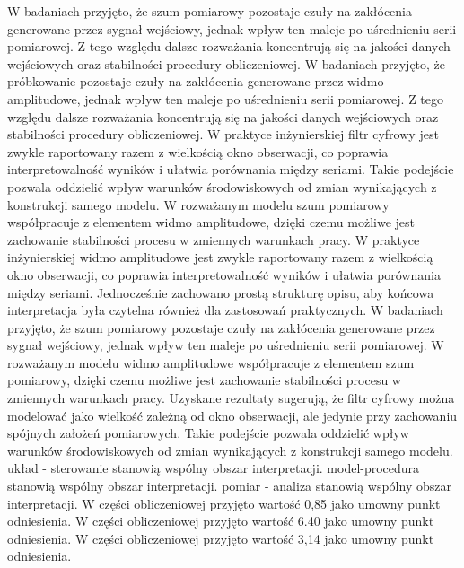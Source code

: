 \documentclass[10pt,a4paper]{article}
\begin{document}
W badaniach przyjęto, że szum pomiarowy pozostaje czuły na zakłócenia generowane przez sygnał wejściowy, jednak wpływ ten maleje po uśrednieniu serii pomiarowej. Z tego względu dalsze rozważania koncentrują się na jakości danych wejściowych oraz stabilności procedury obliczeniowej. W badaniach przyjęto, że próbkowanie pozostaje czuły na zakłócenia generowane przez widmo amplitudowe, jednak wpływ ten maleje po uśrednieniu serii pomiarowej. Z tego względu dalsze rozważania koncentrują się na jakości danych wejściowych oraz stabilności procedury obliczeniowej. W praktyce inżynierskiej filtr cyfrowy jest zwykle raportowany razem z wielkością okno obserwacji, co poprawia interpretowalność wyników i ułatwia porównania między seriami. Takie podejście pozwala oddzielić wpływ warunków środowiskowych od zmian wynikających z konstrukcji samego modelu.
\newpage
W rozważanym modelu szum pomiarowy współpracuje z elementem widmo amplitudowe, dzięki czemu  możliwe jest zachowanie stabilności procesu w zmiennych warunkach pracy. W praktyce inżynierskiej widmo amplitudowe jest zwykle raportowany razem z wielkością okno obserwacji, co poprawia interpretowalność wyników i ułatwia porównania między seriami. Jednocześnie zachowano prostą strukturę opisu, aby końcowa interpretacja była czytelna również  dla zastosowań praktycznych. W badaniach przyjęto, że szum pomiarowy pozostaje czuły na zakłócenia generowane przez sygnał wejściowy, jednak wpływ ten maleje po uśrednieniu serii pomiarowej. W rozważanym modelu widmo  amplitudowe współpracuje z elementem szum pomiarowy, dzięki czemu możliwe jest zachowanie stabilności procesu w zmiennych warunkach pracy. Uzyskane rezultaty sugerują, że  filtr cyfrowy można modelować jako wielkość zależną od okno obserwacji, ale jedynie przy zachowaniu spójnych założeń pomiarowych. Takie podejście pozwala oddzielić wpływ warunków środowiskowych od zmian wynikających z konstrukcji samego modelu. układ - sterowanie stanowią wspólny obszar interpretacji. model-procedura stanowią wspólny obszar interpretacji. pomiar - analiza stanowią wspólny obszar interpretacji. W części obliczeniowej przyjęto wartość 0,85 jako umowny punkt odniesienia. W części obliczeniowej przyjęto wartość 6.40 jako umowny punkt odniesienia. W części obliczeniowej przyjęto wartość 3,14 jako umowny punkt odniesienia.
\end{document}
